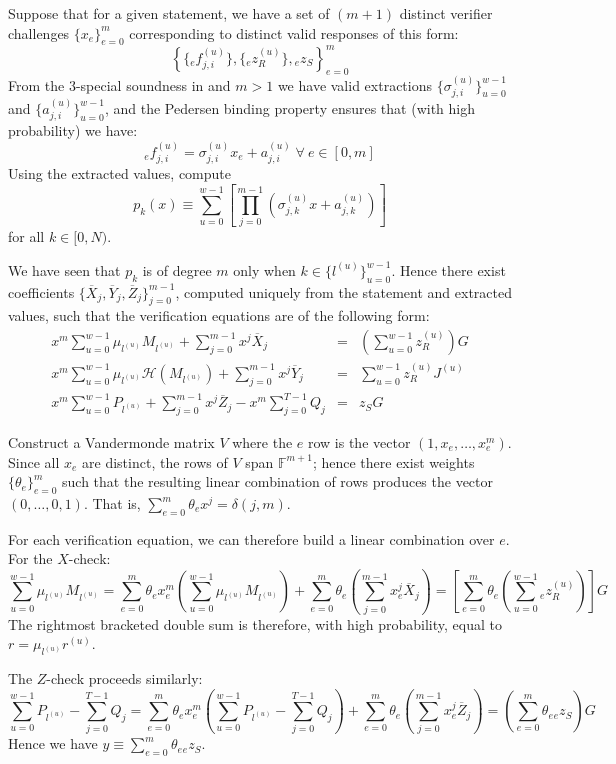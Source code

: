 \documentclass[draft]{article}
\newcommand{\F}{\mathbb{F}}
\newcommand{\hp}{\mathcal{H}}
\newcommand{\sumj}{\sum_{j=0}^{m-1}}
\newcommand{\sumu}{\sum_{u=0}^{w-1}}
\begin{document}
Suppose that for a given statement, we have a set of $(m+1)$ distinct verifier challenges $\{x_e\}_{e=0}^m$ corresponding to distinct valid responses of this form:
$$\left\{ \{{}_ef^{(u)}_{j,i}\}, \{{}_ez^{(u)}_R\}, {}_ez_S \right\}_{e=0}^m$$
From the $3$-special soundness in \cite{bootle} and $m > 1$ we have valid extractions $\{\sigma^{(u)}_{j,i}\}_{u=0}^{w-1}$ and $\{a^{(u)}_{j,i}\}_{u=0}^{w-1}$, and the Pedersen binding property ensures that (with high probability) we have:
$${}_ef^{(u)}_{j,i} = \sigma^{(u)}_{j,i}x_e + a^{(u)}_{j,i} \; \forall \: e \in [0,m]$$
Using the extracted values, compute
$$p_k(x) \equiv \sum_{u=0}^{w-1}\left[ \prod_{j=0}^{m-1} \left( \sigma^{(u)}_{j,k}x + a^{(u)}_{j,k} \right) \right]$$
for all $k \in [0,N)$.

We have seen that $p_k$ is of degree $m$ only when $k \in \{l^{(u)}\}_{u=0}^{w-1}$.
Hence there exist coefficients $\{\overline{X}_j,\overline{Y}_j,\overline{Z}_j\}_{j=0}^{m-1}$, computed uniquely from the statement and extracted values, such that the verification equations are of the following form:
\begin{eqnarray*}
x^m \sumu \mu_{l^{(u)}}M_{l^{(u)}} + \sumj x^j\overline{X}_j &=& \left( \sumu z^{(u)}_R \right)G \\
x^m \sumu \mu_{l^{(u)}}\hp(M_{l^{(u)}}) + \sumj x^j\overline{Y}_j &=& \sumu z^{(u)}_RJ^{(u)} \\
x^m \sumu P_{l^{(u)}} + \sumj x^j\overline{Z}_j - x^m \sum_{j=0}^{T-1} Q_j &=& z_SG
\end{eqnarray*}

Construct a Vandermonde matrix $V$ where the $e$ row is the vector $(1,x_e,\ldots,x^m_e)$.
Since all $x_e$ are distinct, the rows of $V$ span $\F^{m+1}$; hence there exist weights $\{\theta_e\}_{e=0}^m$ such that the resulting linear combination of rows produces the vector $(0,\ldots,0,1)$.
That is, $\sum_{e=0}^m \theta_ex^j = \delta(j,m)$.

For each verification equation, we can therefore build a linear combination over $e$. For the $X$-check:
$$\sumu \mu_{l^{(u)}} M_{l^{(u)}} = \sum_{e=0}^m \theta_ex_e^m \left( \sumu \mu_{l^{(u)}} M_{l^{(u)}} \right) + \sum_{e=0}^m \theta_e \left( \sumj x_e^j \overline{X}_j \right) = \left[ \sum_{e=0}^m \theta_e \left( \sumu {}_ez^{(u)}_R \right) \right]G$$
The rightmost bracketed double sum is therefore, with high probability, equal to $r = \mu_{l^{(u)}} r^{(u)}$.

The $Z$-check proceeds similarly:
$$\sumu P_{l^{(u)}} - \sum_{j=0}^{T-1} Q_j = \sum_{e=0}^m \theta_ex_e^m \left( \sumu P_{l^{(u)}} - \sum_{j=0}^{T-1} Q_j \right) + \sum_{e=0}^m \theta_e \left( \sumj x_e^j \overline{Z}_j \right) = \left( \sum_{e=0}^m \theta_e {}_ez_S  \right)G$$
Hence we have $y \equiv \sum_{e=0}^m \theta_e {}_ez_S$.
\end{document}
